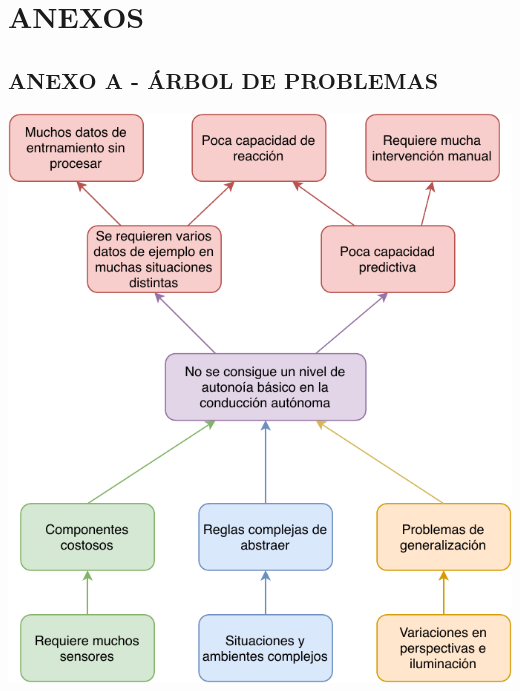 \newpage
{}
{}
\setcounter{section}{0}
\renewcommand{\thesection}{\Alph{section}}
\renewcommand{\theHsection}{appendixsection.\Alph{section}}

\chapter*{ANEXOS}
\section*{ANEXO A - ÁRBOL DE PROBLEMAS}
\begin{center}
	\includegraphics[scale=1]{imagenes/arbol_de_problemas}
\end{center}
\newpage
